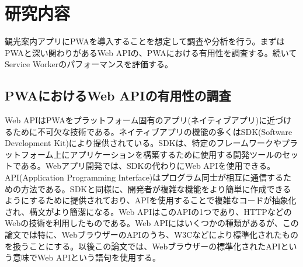 \section{研究内容}\label{section:研究内容}
観光案内アプリにPWAを導入することを想定して調査や分析を行う。まずはPWAと深い関わりがあるWeb APIの、PWAにおける有用性を調査する。続いてService Workerのパフォーマンスを評価する。
\subsection{PWAにおけるWeb APIの有用性の調査}\label{subsection:PWAにおけるWeb APIの有用性の調査}
Web APIはPWAをプラットフォーム固有のアプリ(ネイティブアプリ)に近づけるために不可欠な技術である。ネイティブアプリの機能の多くはSDK(Software Development Kit)により提供されている。SDKは、特定のフレームワークやプラットフォーム上にアプリケーションを構築するために使用する開発ツールのセットである。Webアプリ開発では、SDKの代わりにWeb APIを使用できる。API(Application Programming Interface)はプログラム同士が相互に通信するための方法である。SDKと同様に、開発者が複雑な機能をより簡単に作成できるようにするために提供されており、APIを使用することで複雑なコードが抽象化され、構文がより簡潔になる。Web APIはこのAPIの1つであり、HTTPなどのWebの技術を利用したものである。Web APIにはいくつかの種類があるが、この論文では特に、WebブラウザーのAPIのうち、W3Cなどにより標準化されたものを扱うことにする。以後この論文では、Webブラウザーの標準化されたAPIという意味でWeb APIという語句を使用する。
